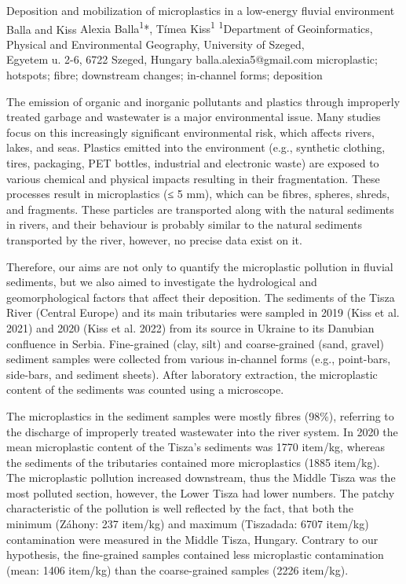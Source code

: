 \abstract
{Deposition and mobilization of microplastics in a low-energy fluvial environment} 
{Balla and Kiss} 
{Alexia Balla\textsuperscript{1}*, Tímea Kiss\textsuperscript{1}} 
{\TLtag} 
{
\textsuperscript{1}Department of Geoinformatics, Physical and Environmental Geography, University of Szeged, \\Egyetem u. 2-6, 6722 Szeged, Hungary
}
{balla.alexia5@gmail.com}  %
{microplastic; hotspots; fibre; downstream changes; in-channel forms; deposition}
{The emission of organic and inorganic pollutants and plastics through improperly treated garbage and wastewater is a major environmental issue. Many studies focus on this increasingly significant environmental risk, which affects rivers, lakes, and seas. Plastics emitted into the environment (e.g., synthetic clothing, tires, packaging, PET bottles, industrial and electronic waste) are exposed to various chemical and physical impacts resulting in their fragmentation. These processes result in microplastics (≤ 5 mm), which can be fibres, spheres, shreds, and fragments. These particles are transported along with the natural sediments in rivers, and their behaviour is probably similar to the natural sediments transported by the river, however, no precise data exist on it. 

Therefore, our aims are not only to quantify the microplastic pollution in fluvial sediments, but we also aimed to investigate the hydrological and geomorphological factors that affect their deposition. The sediments of the Tisza River (Central Europe) and its main tributaries were sampled in 2019 (Kiss et al. 2021) and 2020 (Kiss et al. 2022) from its source in Ukraine to its Danubian confluence in Serbia. Fine-grained (clay, silt) and coarse-grained (sand, gravel) sediment samples were collected from various in-channel forms (e.g., point-bars, side-bars, and sediment sheets). After laboratory extraction, the microplastic content of the sediments was counted using a microscope.

The microplastics in the sediment samples were mostly fibres (98\%), referring to the discharge of improperly treated wastewater into the river system. In 2020 the mean microplastic content of the Tisza’s sediments was 1770 item/kg, whereas the sediments of the tributaries contained more microplastics (1885 item/kg). The microplastic pollution increased downstream, thus the Middle Tisza was the most polluted section, however, the Lower Tisza had lower numbers. The patchy characteristic of the pollution is well reflected by the fact, that both the minimum (Záhony: 237 item/kg) and maximum (Tiszadada: 6707 item/kg) contamination were measured in the Middle Tisza, Hungary.
Contrary to our hypothesis, the fine-grained samples contained less microplastic contamination (mean: 1406 item/kg) than the coarse-grained samples (2226 item/kg). 

}
